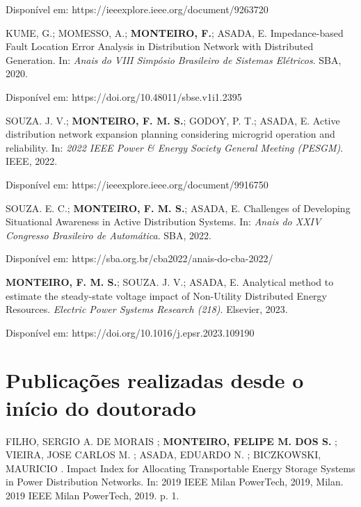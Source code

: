 \noindent Disponível em:  https://ieeexplore.ieee.org/document/9263720


\vspace{1cm}
\noindent KUME, G.; MOMESSO, A.; \textbf{MONTEIRO, F.}; ASADA, E. Impedance-based Fault Location Error Analysis in Distribution Network with Distributed Generation. In: \textit{Anais do VIII Simpósio Brasileiro de Sistemas Elétricos}. SBA, 2020.

\noindent Disponível em: https://doi.org/10.48011/sbse.v1i1.2395


\vspace{1cm}
\noindent SOUZA. J. V.; \textbf{MONTEIRO, F. M. S.};  GODOY, P. T.; ASADA, E. Active distribution network expansion planning considering microgrid operation and reliability. In: \textit{ 2022 IEEE Power \& Energy Society General Meeting (PESGM)}. IEEE, 2022.

\noindent Disponível em:  https://ieeexplore.ieee.org/document/9916750



\vspace{1cm}
\noindent SOUZA. E. C.; \textbf{MONTEIRO, F. M. S.}; ASADA, E. Challenges of Developing Situational Awareness in Active Distribution Systems. In: \textit{Anais do XXIV Congresso Brasileiro de Automática}. SBA, 2022.

\noindent Disponível em:  https://sba.org.br/cba2022/anais-do-cba-2022/



\vspace{1cm}
\noindent \textbf{MONTEIRO, F. M. S.}; SOUZA. J. V.; ASADA, E. Analytical method to estimate the steady-state voltage impact of Non-Utility Distributed Energy Resources. \textit{Electric Power Systems Research (218)}. Elsevier, 2023.

\noindent Disponível em: https://doi.org/10.1016/j.epsr.2023.109190






\iffalse
\vspace{-0.5cm}


\section{Publicações realizadas desde o início do doutorado}

\noindent FILHO, SERGIO A. DE MORAIS ; \textbf{MONTEIRO, FELIPE M. DOS S.} ; VIEIRA, JOSE CARLOS M. ; ASADA, EDUARDO N. ; BICZKOWSKI, MAURICIO . Impact Index for Allocating Transportable Energy Storage Systems in Power Distribution Networks. In: 2019 IEEE Milan PowerTech, 2019, Milan. 2019 IEEE Milan PowerTech, 2019. p. 1. 


